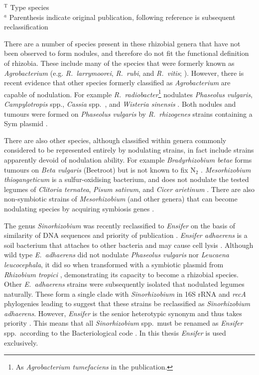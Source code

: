   \vspace{-0.9cm}
  {\footnotesize
  \noindent $^{\mathrm{T}}$ Type species \\
  $^a$ Parenthesis indicate original publication, following reference is subsequent
  reclassification \\ }
  \medskip

\onehalfspacing

There are a number of species present in these rhizobial genera that
have not been observed to form nodules, and therefore do not fit the
functional definition of rhizobia. These include many of the species
that were formerly known as \emph{Agrobacterium} (e.g.
\emph{R.~larrymoorei}, \emph{R.~rubi}, and \emph{R.~vitis};
\citep{Young01a,Young04a}). However, there is recent evidence that
other species formerly classified as \emph{Agrobacterium} are
capable of nodulation. For example \emph{R.~radiobacter}\footnote{As
\emph{Agrobacterium tumefaciens} in the publication.} nodulates
\emph{Phaseolus vulgaris}, \emph{Campylotropis} spp., \emph{Cassia}
spp.~\citep{Han05}, and \emph{Wisteria sinensis} \citep{Lui05}. Both
nodules and tumours were formed on \emph{Phaseolus vulgaris} by
\emph{R.~rhizogenes} strains containing a Sym plasmid
\citep{Velazquez05}.

There are also other species, although classified within genera
commonly considered to be represented entirely by nodulating
strains, in fact include strains apparently devoid of nodulation
ability. For example \emph{Bradyrhizobium betae} forms tumours on
\emph{Beta vulgaris} (Beetroot) but is not known to fix N$_2$
\citep{Rivas04a}. \emph{Mesorhizobium thiogangeticum} is a
sulfur-oxidising bacterium, and does not nodulate the tested legumes
of \emph{Clitoria ternatea}, \emph{Pisum sativum}, and \emph{Cicer
arietinum} \citep{Gosh06}. There are also non-symbiotic strains of
\emph{Mesorhizobium} (and other genera) that can become nodulating
species by acquiring symbiosis genes \citep{Sullivan95}.

The genus \emph{Sinorhizobium} was recently reclassified to
\emph{Ensifer} on the basis of similarity of DNA sequences and
priority of publication \citep{Willems03,Young03b}. \emph{Ensifer
adhaerens} is a soil bacterium that attaches to other bacteria and
may cause cell lysis \citep{Casida82}. Although wild type
\emph{E.~adhaerens} did not nodulate \emph{Phaseolus vulgaris} nor
\emph{Leucaena leucocephala}, it did so when transformed with a
symbiotic plasmid from \emph{Rhizobium tropici} \citep{Rogel01},
demonstrating its capacity to become a rhizobial species. Other
\emph{E.~adhaerens} strains were subsequently isolated that
nodulated legumes naturally. These form a single clade with
\emph{Sinorhizobium} in 16S rRNA and \emph{recA} phylogenies leading
\citet{Willems03} to suggest that these strains be reclassified as
\emph{Sinorhizobium adhaerens}. However, \emph{Ensifer}
\citep{Casida82} is the senior heterotypic synonym and thus takes
priority \citep{Young03b}. This means that all \emph{Sinorhizobium}
spp.~must be renamed as \emph{Ensifer} spp.~according to the
Bacteriological code \citep{Lapage90}. In this thesis \emph{Ensifer}
is used exclusively.

